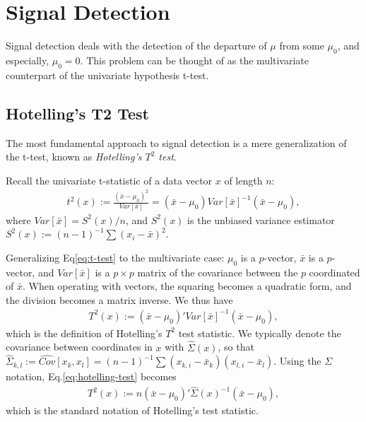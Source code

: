 \documentclass[]{book}
\theoremstyle{definition}
\theoremstyle{definition}
\theoremstyle{definition}
\theoremstyle{remark}
\begin{document}
\hypertarget{signal-detection}{%
\section{Signal Detection}\label{signal-detection}}

Signal detection deals with the detection of the departure of \(\mu\) from some \(\mu_0\), and especially, \(\mu_0=0\).
This problem can be thought of as the multivariate counterpart of the univariate hypothesis t-test.

\hypertarget{hotellings-t2-test}{%
\subsection{Hotelling's T2 Test}\label{hotellings-t2-test}}

The most fundamental approach to signal detection is a mere generalization of the t-test, known as \emph{Hotelling's \(T^2\) test}.

Recall the univariate t-statistic of a data vector \(x\) of length \(n\):
\begin{align}
  t^2(x):= \frac{(\bar{x}-\mu_0)^2}{Var[\bar{x}]}= (\bar{x}-\mu_0)Var[\bar{x}]^{-1}(\bar{x}-\mu_0),
  \label{eq:t-test}
\end{align}
where \(Var[\bar{x}]=S^2(x)/n\), and \(S^2(x)\) is the unbiased variance estimator \(S^2(x):=(n-1)^{-1}\sum (x_i-\bar x)^2\).

Generalizing Eq\eqref{eq:t-test} to the multivariate case:
\(\mu_0\) is a \(p\)-vector, \(\bar x\) is a \(p\)-vector, and \(Var[\bar x]\) is a \(p \times p\) matrix of the covariance between the \(p\) coordinated of \(\bar x\).
When operating with vectors, the squaring becomes a quadratic form, and the division becomes a matrix inverse.
We thus have
\begin{align}
  T^2(x):= (\bar{x}-\mu_0)' Var[\bar{x}]^{-1} (\bar{x}-\mu_0),
  \label{eq:hotelling-test}
\end{align}
which is the definition of Hotelling's \(T^2\) test statistic.
We typically denote the covariance between coordinates in \(x\) with \(\hat \Sigma(x)\), so that
\(\widehat \Sigma_{k,l}:=\widehat {Cov}[x_k,x_l]=(n-1)^{-1} \sum (x_{k,i}-\bar x_k)(x_{l,i}-\bar x_l)\).
Using the \(\Sigma\) notation, Eq.\eqref{eq:hotelling-test} becomes
\begin{align}
  T^2(x):= n (\bar{x}-\mu_0)' \hat \Sigma(x)^{-1} (\bar{x}-\mu_0),
\end{align}
which is the standard notation of Hotelling's test statistic.
\end{document}

